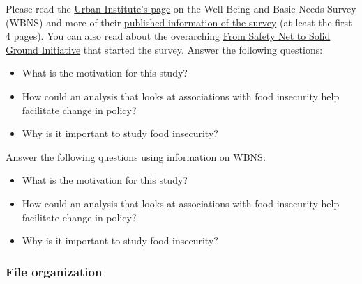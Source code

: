 \documentclass[
  letterpaper,
  DIV=11,
  numbers=noendperiod]{scrartcl}
\providecommand{\tightlist}{%
  \setlength{\itemsep}{0pt}\setlength{\parskip}{0pt}}
\begin{document}
Please read the
\href{https://www.urban.org/policy-centers/health-policy-center/projects/well-being-and-basic-needs-survey}{Urban
Institute's page} on the Well-Being and Basic Needs Survey (WBNS) and
more of their
\href{https://www.urban.org/sites/default/files/publication/98919/the_well-being_and_basic_needs_survey_1.pdf}{published
information of the survey} (at least the first 4 pages). You can also
read about the overarching
\href{https://www.urban.org/tags/safety-net-solid-ground\#about}{From
Safety Net to Solid Ground Initiative} that started the survey. Answer
the following questions:

\begin{itemize}
\tightlist
\item
  What is the motivation for this study?
\item
  How could an analysis that looks at associations with food insecurity
  help facilitate change in policy?
\item
  Why is it important to study food insecurity?
\end{itemize}

\begin{tcolorbox}[enhanced jigsaw, toptitle=1mm, toprule=.15mm, leftrule=.75mm, bottomtitle=1mm, breakable, opacityback=0, titlerule=0mm, title=\textcolor{quarto-callout-important-color}{\faExclamation}\hspace{0.5em}{Task}, arc=.35mm, colback=white, rightrule=.15mm, left=2mm, colbacktitle=quarto-callout-important-color!10!white, coltitle=black, opacitybacktitle=0.6, colframe=quarto-callout-important-color-frame, bottomrule=.15mm]

Answer the following questions using information on WBNS:

\begin{itemize}
\tightlist
\item
  What is the motivation for this study?
\item
  How could an analysis that looks at associations with food insecurity
  help facilitate change in policy?
\item
  Why is it important to study food insecurity?
\end{itemize}

\end{tcolorbox}

\subsubsection{File organization}\label{file-organization}
\end{document}
